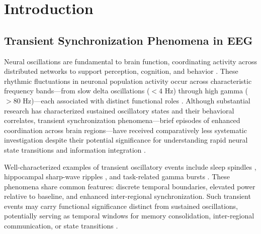\documentclass[11pt,a4paper]{article}
\newcommand{\phisym}{\varphi}
\begin{document}
\begin{abstract}
These findings establish $\phisym^n$ architecture as a fundamental organizing principle of human neural oscillations, providing the first mathematically principled basis for EEG frequency band definitions. Whether the correspondence between neural $f_0$ and Earth's Schumann Resonance reflects evolutionary optimization, biophysical convergence, or coincidence cannot be determined without concurrent geomagnetic measurement.

\vspace{0.3cm}
\textbf{Keywords:} EEG, golden ratio, Schumann Resonance, neural oscillations, frequency bands, phase synchronization, transient dynamics, spectral architecture
\end{abstract}

\newpage
\tableofcontents
\newpage

\section{Introduction}

\subsection{Transient Synchronization Phenomena in EEG}

Neural oscillations are fundamental to brain function, coordinating activity across distributed networks to support perception, cognition, and behavior \parencite{gy_rgy_buzs_ki_c98dac5c, pascal_fries_7b9d1ced}. These rhythmic fluctuations in neuronal population activity occur across characteristic frequency bands---from slow delta oscillations ($<4$ Hz) through high gamma ($>80$ Hz)---each associated with distinct functional roles \parencite{wolfgang_klimesch_be1f7786, engel2010beta, cohen2017where}. Although substantial research has characterized sustained oscillatory states and their behavioral correlates, transient synchronization phenomena---brief episodes of enhanced coordination across brain regions---have received comparatively less systematic investigation despite their potential significance for understanding rapid neural state transitions and information integration \parencite{siegel2012spectral, canolty2010functional}.

Well-characterized examples of transient oscillatory events include sleep spindles \parencite{fernandez2020sleep}, hippocampal sharp-wave ripples \parencite{buzsaki2015hippocampal}, and task-related gamma bursts \parencite{fries2001modulation}. These phenomena share common features: discrete temporal boundaries, elevated power relative to baseline, and enhanced inter-regional synchronization. Such transient events may carry functional significance distinct from sustained oscillations, potentially serving as temporal windows for memory consolidation, inter-regional communication, or state transitions \parencite{john_lisman_100e4cf6}.
\end{document}
